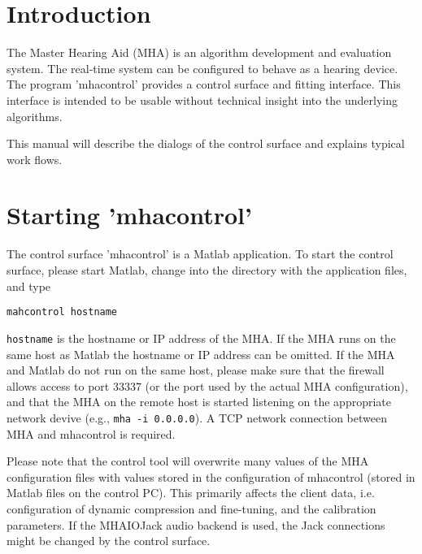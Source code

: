 \documentclass[11pt,a4paper,twoside]{article}
\newcommand{\+}{\discretionary{\mbox{\scriptsize$\hookleftarrow$}}{}{}}
\begin{document}
\newpage
\MHAcopyright{}
\newpage
\tableofcontents
\newpage
\renewcommand{\leftmark}{\rightmark}


\section{Introduction}

The Master Hearing Aid (MHA) is an algorithm development and evaluation
system.
%
The real-time system can be configured to behave as a hearing device.
%
The program 'mhacontrol' provides a control surface and fitting
interface.
%
This interface is intended to be usable without technical insight into
the underlying algorithms.

This manual will describe the dialogs of the control surface and
explains typical work flows.

\section{Starting 'mhacontrol'}

The control surface 'mhacontrol' is a Matlab
application.
%
To start the control surface, please start Matlab, change into the
directory with the application files, and type
%
\begin{verbatim}
mahcontrol hostname
\end{verbatim}
%
\verb!hostname! is the hostname or IP address of the MHA.
%
If the MHA runs on the same host as Matlab the hostname or IP address
can be omitted.
%
If the MHA and Matlab do not run on the same host, please make sure
that the firewall allows access to port
33337 (or the port used by the actual MHA configuration), and that the
MHA on the remote host is started listening on the appropriate network
devive (e.g., \verb!mha -i 0.0.0.0!).
%
A TCP network connection between MHA and mhacontrol is required.

Please note that the control tool will overwrite many values of the
MHA configuration files with values stored in the configuration of
mhacontrol (stored in Matlab files on the control PC).
%
This primarily affects the client data, i.e. configuration of dynamic
compression and fine-tuning, and the calibration parameters.
%
If the MHAIOJack audio backend is used, the Jack connections might be
changed by the control surface.
\end{document}
